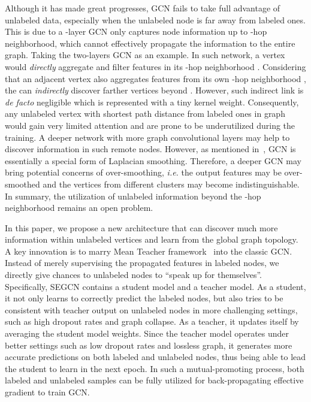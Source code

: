 \documentclass[letterpaper]{article} \usepackage{aaai19}  \usepackage{times}  \usepackage{helvet}  \usepackage{courier}  \usepackage{url}  \usepackage{graphicx}  \usepackage{algorithm}
\begin{document}
Although it has made great progresses, GCN fails to take full advantage of unlabeled data, especially when the unlabeled node is far away from labeled ones. This is due to a -layer GCN only captures node information up to -hop neighborhood, which cannot effectively propagate the information to the entire graph. Taking the two-layers GCN as an example. In such network, a vertex  would \emph{directly} aggregate and filter features in its -hop neighborhood . Considering that an adjacent vertex  also aggregates features from its own -hop neighborhood , the  can \emph{indirectly} discover farther vertices beyond . However, such indirect link is \emph{de facto} negligible which is represented with a tiny kernel weight. Consequently, any unlabeled vertex with shortest path distance  from labeled ones in graph would gain very limited attention and are prone to be underutilized during the training. A deeper network with more graph convolutional layers may help to discover information in such remote nodes. However, as mentioned in~\cite{li2018deeper}, GCN is essentially a special form of Laplacian smoothing. Therefore, a deeper GCN may bring potential concerns of over-smoothing, \emph{i.e.} the output features may be over-smoothed and the vertices from different clusters may become indistinguishable. In summary, the utilization of unlabeled information beyond the -hop neighborhood remains an open problem. 

In this paper, we propose a new architecture that can discover much more information within unlabeled vertices and learn from the global graph topology. A key innovation is to marry Mean Teacher framework~\cite{tarvainen2017mean} into the classic GCN. Instead of merely supervising the propagated features in labeled nodes, we directly give chances to unlabeled nodes to ``speak up for themselves''. Specifically, SEGCN contains a student model and a teacher model. As a student, it not only learns to correctly predict the labeled nodes, but also tries to be consistent with teacher output on unlabeled nodes in more challenging settings, such as high dropout rates and graph collapse. As a teacher, it updates itself by averaging the student model weights. Since the teacher model operates under better settings such as low dropout rates and lossless graph, it generates more accurate predictions on both labeled and unlabeled nodes, thus being able to lead the student to learn in the next epoch. In such a mutual-promoting process, both labeled and unlabeled samples can be fully utilized for back-propagating effective gradient to train GCN.
\end{document}
